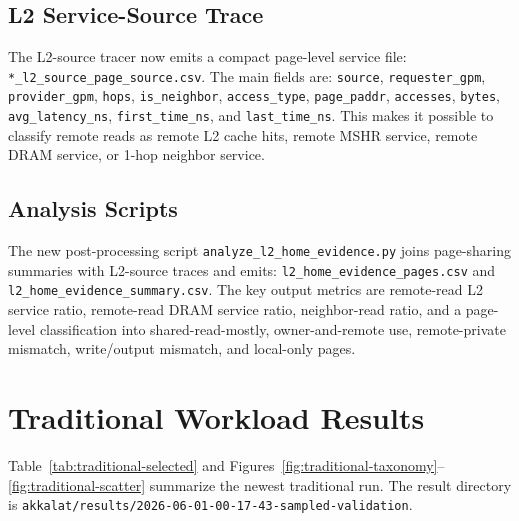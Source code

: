 \documentclass[sigconf,screen,review,anonymous]{acmart}
\begin{document}
\subsection{L2 Service-Source Trace}

The L2-source tracer now emits a compact page-level service file:
\texttt{*\_l2\_source\_page\_source.csv}.  The main fields are:
\texttt{source}, \texttt{requester\_gpm}, \texttt{provider\_gpm},
\texttt{hops}, \texttt{is\_neighbor}, \texttt{access\_type},
\texttt{page\_paddr}, \texttt{accesses}, \texttt{bytes},
\texttt{avg\_latency\_ns}, \texttt{first\_time\_ns}, and
\texttt{last\_time\_ns}.  This makes it possible to classify remote reads as
remote L2 cache hits, remote MSHR service, remote DRAM service, or 1-hop
neighbor service.

\subsection{Analysis Scripts}

The new post-processing script \texttt{analyze\_l2\_home\_evidence.py} joins
page-sharing summaries with L2-source traces and emits:
\texttt{l2\_home\_evidence\_pages.csv} and
\texttt{l2\_home\_evidence\_summary.csv}.  The key output metrics are
remote-read L2 service ratio, remote-read DRAM service ratio, neighbor-read
ratio, and a page-level classification into shared-read-mostly, owner-and-remote
use, remote-private mismatch, write/output mismatch, and local-only pages.

\section{Traditional Workload Results}

\begin{table}[t]
  \centering
  \caption{Selected traditional workloads. Remote L2 includes remote L2 cache
  hits and remote MSHR service. Neighbor means 1-hop requester-provider traffic.
  Shared-read and private are fractions of remote accesses after page-level
  classification.}
  \label{tab:traditional-selected}
  \resizebox{\columnwidth}{!}{}
\end{table}

Table~\ref{tab:traditional-selected} and
Figures~\ref{fig:traditional-taxonomy}--\ref{fig:traditional-scatter} summarize
the newest traditional run.  The result directory is
\texttt{akkalat/results/2026-06-01-00-17-43-sampled-validation}.
\end{document}
